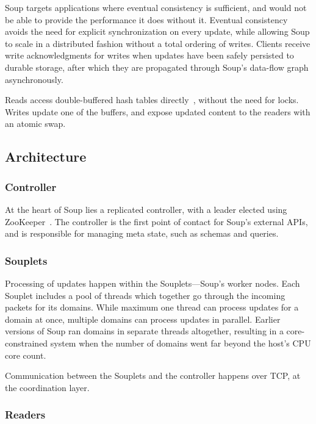 Soup targets applications where eventual consistency is sufficient, and would
not be able to provide the performance it does without it. Eventual consistency
avoids the need for explicit synchronization on every update, while allowing
Soup to scale in a distributed fashion without a total ordering of writes.
Clients receive write acknowledgments for writes when updates have been safely
persisted to durable storage, after which they are propagated through Soup's data-flow
graph asynchronously.

Reads access double-buffered hash tables directly~\cite{evmap}, without the need
for locks. Writes update one of the buffers, and expose updated content to the
readers with an atomic swap.


\subsection{Architecture}\label{sec:soup-architecture}


\subsubsection{Controller}

At the heart of Soup lies a replicated controller, with a leader elected
using ZooKeeper~\cite{zookeeper}. The controller is the first point of contact
for Soup's external APIs, and is responsible for managing meta state, such as
schemas and queries.

\subsubsection{Souplets}

Processing of updates happen within the Souplets---Soup's worker nodes. Each
Souplet includes a pool of threads which together go through the incoming
packets for its domains. While maximum one thread can process updates for a
domain at once, multiple domains can process updates in parallel. Earlier
versions of Soup ran domains in separate threads altogether, resulting in a
core-constrained system when the number of domains went far beyond the host's
CPU core count.

Communication between the Souplets and the controller happens over TCP, at the
coordination layer.

\subsubsection{Readers}

